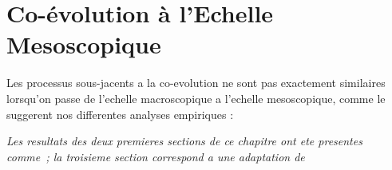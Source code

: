 

\chapter{Co-évolution à l'Echelle Mesoscopique}


\label{ch:mesocoevolution} 




Les processus sous-jacents a la co-evolution ne sont pas exactement similaires lorsqu'on passe de l'echelle macroscopique a l'echelle mesoscopique, comme le suggerent nos differentes analyses empiriques : 





















\stars


\textit{Les resultats des deux premieres sections de ce chapitre ont ete presentes comme~\cite{}; la troisieme section correspond a une adaptation de \cite{}}






